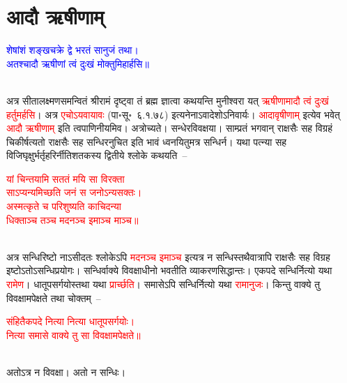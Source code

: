 \section[आदौ ऋषीणाम्]{आदौ ऋषीणाम्‌}
\centering\textcolor{blue}{शेषांशं शङ्खचक्रे द्वे भरतं सानुजं तथा।\nopagebreak\\
अतश्चादौ ऋषीणां त्वं दुःखं मोक्तुमिहार्हसि॥}\nopagebreak\\
\\
\begin{sloppypar}\justifying\noindent\hspace{10mm} अत्र सीता\-लक्ष्मण\-समन्वितं श्रीरामं दृष्ट्वा तं ब्रह्म ज्ञात्वा कथयन्ति मुनीश्वरा यत् \textcolor{red}{ऋषीणामादौ त्वं दुःखं हर्तुमर्हसि}। अत्र \textcolor{red}{एचोऽयवायावः} (पा॰सू॰~६.१.७८) इत्यनेनाऽवादेशोऽनिवार्यः। \textcolor{red}{आदावृषीणाम्‌} इत्येव भवेत् \textcolor{red}{आदौ ऋषीणाम्‌} इति त्वपाणिनीयमिव। अत्रोच्यते। सन्धेरविवक्षया। साम्प्रतं भगवान् राक्षसैः सह विग्रहं चिकीर्षत्यतो राक्षसैः सह सन्धिरनुचित इति भावं ध्वनयितुमत्र सन्धिर्न। यथा पत्न्या सह विजिघृक्षुर्भर्तृहरिर्नीति\-शतकस्य द्वितीये श्लोके कथयति~–\end{sloppypar}
\centering\textcolor{red}{यां चिन्तयामि सततं मयि सा विरक्ता\nopagebreak\\
साऽप्यन्यमिच्छति जनं स जनोऽन्यसक्तः।\\
अस्मत्कृते च परिशुष्यति काचिदन्या\\
धिक्ताञ्च तञ्च मदनञ्च इमाञ्च माञ्च॥}\nopagebreak\\
\\
\begin{sloppypar}\justifying\noindent अत्र सन्धिरिष्टो नाऽसीदतः श्लोकेऽपि \textcolor{red}{मदनञ्च इमाञ्च} इत्यत्र न सन्धिस्तथैवात्रापि राक्षसैः सह विग्रह इष्टोऽतोऽसन्धि\-प्रयोगः। सन्धिर्वाक्ये विवक्षाधीनो भवतीति व्याकरण\-सिद्धान्तः। एकपदे सन्धिर्नित्यो यथा \textcolor{red}{रामेण}। धातूपसर्गयोस्तथा यथा \textcolor{red}{प्रार्च्छति}। समासेऽपि सन्धिर्नित्यो यथा \textcolor{red}{रामानुजः}। किन्तु वाक्ये तु विवक्षामपेक्षते तथा चोक्तम्~–\end{sloppypar}
\centering\textcolor{red}{संहितैकपदे नित्या नित्या धातूपसर्गयोः।\nopagebreak\\
नित्या समासे वाक्ये तु सा विवक्षामपेक्षते॥}\nopagebreak\\
\\
\begin{sloppypar}\justifying\noindent अतोऽत्र न विवक्षा। अतो न सन्धिः। \end{sloppypar}
